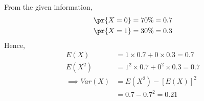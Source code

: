 From the given information,
\begin{align}
\pr{X=0} = 70 {\%} = 0.7\\
\pr{X=1} = 30 {\%} =0.3
\end{align}
Hence,
\begin{align}
    E(X) &= 1\times0.7 + 0\times0.3 =0.7
    \\
    E(X^2) &= 1^2\times0.7 + 0^2\times0.3 =0.7
    \\
    \implies Var(X) &= E(X^2) -[E(X)]^2
    \\&= 0.7- 0.7^2 = 0.21
\end{align}